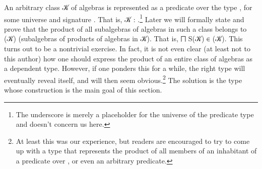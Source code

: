 An arbitrary class \ab 𝒦 of algebras is represented as a predicate over the type \AgdaSpace{}\AgdaSpace{}, for some universe  and signature . That is, \ab 𝒦 \as : \AgdaSpace{}%
\AgdaSymbol{(}\AgdaSpace{}%
\AgdaSpace{}%
\AgdaSymbol{)}\AgdaSpace{}%
\AgdaUnderscore.\footnote{%
The underscore is merely a placeholder for the universe of the predicate type and doesn't concern us here.} Later we will formally state and prove that the product of all subalgebras of algebras in such a class belongs to (\ab 𝒦) (subalgebras of products of algebras in \ab 𝒦). That is, \af ⨅ \af S(\ab 𝒦) \af ∈ (\ab 𝒦). This turns out to be a nontrivial exercise. In fact, it is not even clear (at least not to this author) how one should express the product of an entire class of algebras as a dependent type. However, if one ponders this for a while, the right type will eventually reveal itself, and will then seem obvious.\footnote{%
At least this was our experience, but readers are encouraged to try to come up with a type that represents the product of all members of an inhabitant of a predicate over \AgdaSpace{}\AgdaSpace{}, or even an arbitrary predicate.} The solution is the  type whose construction is the main goal of this section.

